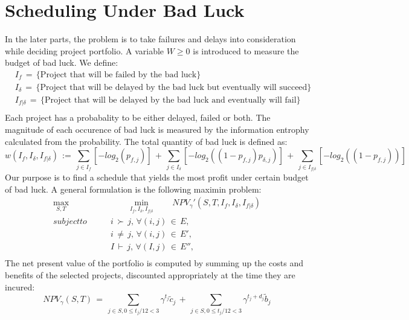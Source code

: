 \documentclass[final,3p,times]{elsarticle}
\begin{document}
\section{Scheduling Under Bad Luck}
In the later parts, the problem is to take failures and delays into consideration while deciding project portfolio. A variable $W\geq 0$ is introduced  to measure the budget of bad luck. We define:
\begin{align*}
&I_f\,=\, \{\mbox{Project that will be failed by the bad luck}\}\\
&I_{\delta}\,=\, \{\mbox{Project that will be delayed by the bad luck but eventually will succeed}\}\\
&I_{f|\delta}\,=\, \{\mbox{Project that will be delayed by the bad luck and eventually will fail}\}\\
\end{align*}
Each project has a probabality to be either delayed, failed or both. The magnitude of each occurence of bad luck is measured by the information entrophy calculated from the probability. The total quantity of bad luck is defined as:
\begin{equation*}
w(I_f, I_{\delta}, I_{f|\delta})\,:=\,\sum_{j\in I_f} [-log_2(p_{f,j})]\,+\,\sum_{j\in I_{\delta}}[-log_2((1-p_{f,j})p_{\delta,j})]\,+\,\sum_{j\in I_{f|\delta}}[-log_2((1-p_{f,j}))]
\end{equation*}
Our purpose is to find a schedule that yields the most profit under certain budget of bad luck. A general formulation is the following maximin problem:
\begin{equation}\label{SecondOrProblem}
\begin{aligned}
\max_{S,T}&\qquad\min_{I_f, I_{\delta}, I_{f|\delta}}\qquad NPV_{\gamma}'(S,T,I_f, I_{\delta}, I_{f|\delta})\\
subject to \qquad & i\,\succ\,j,\,\forall (i,j)\,\in\,E,\\
& i \,\neq \,j, \,\forall (i,j)\,\in\,E',\\
& I \,\vdash \,j, \,\forall (I,j)\,\in\,E'',\\
\end{aligned}
\end{equation}
The net present value of the portfolio is computed by summing up the costs and benefits of the selected projects, discounted appropriately at the time they are incured:
\begin{equation}
NPV_{\gamma}(S,T)\,=\,\sum_{j\in S, 0\leq t_j/12<3} \gamma^{t_j} \tilde{c}_j\,+\,\sum_{j\in S, 0\leq t_j/12<3} \gamma^{t_j+d_j} \tilde{b}_j
\end{equation}
\end{document}
